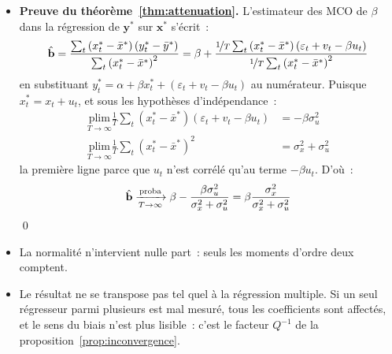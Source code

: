 \documentclass[10pt]{beamer}
\begin{document}
\begin{notes}

  \begin{itemize}

  \item \textbf{Preuve du théorème~\ref{thm:attenuation}.} L'estimateur des MCO
    de $\beta$ dans la régression de $\mathbf y^*$ sur $\mathbf x^*$ s'écrit~:
    \[
      \hat{\mathbf b} = \frac{\sum_t\left(x_t^* - \bar{x}^*\right)\left(y_t^* - \bar{y}^*\right)}{\sum_t\left(x_t^* - \bar{x}^*\right)^2}
      = \beta + \frac{\nicefrac{1}{T}\sum_t\left(x_t^* - \bar{x}^*\right)\left(\varepsilon_t + v_t - \beta u_t\right)}{\nicefrac{1}{T}\sum_t\left(x_t^* - \bar{x}^*\right)^2}
    \]
    en substituant $y_t^* = \alpha + \beta x_t^* + (\varepsilon_t+v_t-\beta u_t)$
    au numérateur. Puisque $x_t^* = x_t + u_t$, et sous les hypothèses
    d'indépendance~:
    \[
      \begin{split}
        \underset{T\rightarrow\infty}{\text{plim}} \frac{1}{T}\sum_t\left(x_t^* - \bar{x}^*\right)\left(\varepsilon_t + v_t - \beta u_t\right) &= -\beta\sigma_u^2 \\
        \underset{T\rightarrow\infty}{\text{plim}} \frac{1}{T}\sum_t\left(x_t^* - \bar{x}^*\right)^2 &= \sigma_x^2 + \sigma_u^2
      \end{split}
    \]
    la première ligne parce que $u_t$ n'est corrélé qu'au terme $-\beta u_t$.
    D'où~:
    \[
      \hat{\mathbf b} \xrightarrow[T\rightarrow\infty]{\text{proba}} \beta - \frac{\beta\sigma_u^2}{\sigma_x^2 + \sigma_u^2} = \beta \frac{\sigma_x^2}{\sigma_x^2 + \sigma_u^2}
    \]
    \qed\newline

  \item La normalité n'intervient nulle part~: seuls les moments d'ordre deux
    comptent.\newline

  \item[\dbend] Le résultat ne se transpose pas tel quel à la régression
    multiple. Si un seul régresseur parmi plusieurs est mal mesuré, tous les
    coefficients sont affectés, et le sens du biais n'est plus lisible~: c'est
    le facteur $Q^{-1}$ de la proposition~\ref{prop:inconvergence}.

  \end{itemize}

\end{notes}
\end{document}
